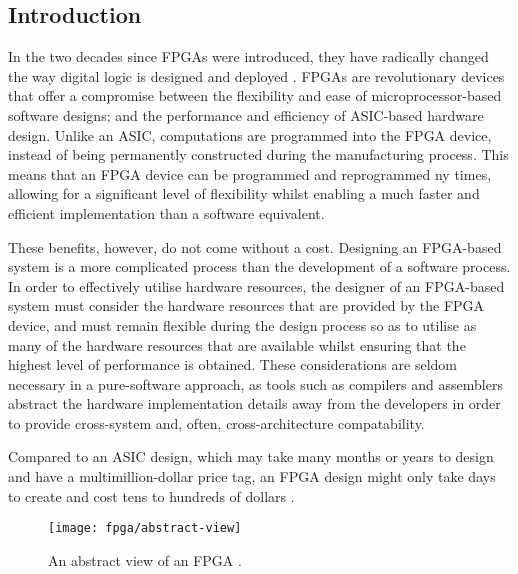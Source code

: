 \subsection{Introduction}
\label{fpga:introduction}
In the two decades since \glspl{FPGA} were introduced, they have radically
changed the way digital logic is designed and deployed \cite{Hauck:2007}.
\glspl{FPGA} are revolutionary devices that offer a compromise between the
flexibility and ease of microprocessor-based software designs; and the
performance and efficiency of \gls{ASIC}-based hardware design. Unlike an
\gls{ASIC}, computations are programmed into the \gls{FPGA} device, instead of
being permanently constructed during the manufacturing process. This means that
an \gls{FPGA} device can be programmed and reprogrammed ny times, allowing for
a significant level of flexibility whilst enabling a much faster and efficient
implementation than a software equivalent.

These benefits, however, do not come without a cost. Designing an
\gls{FPGA}-based system is a more complicated process than the development of a
software process. In order to effectively utilise hardware resources, the
designer of an \gls{FPGA}-based system must consider the hardware resources that
are provided by the \gls{FPGA} device, and must remain flexible during the
design process so as to utilise as many of the hardware resources that are
available whilst ensuring that the highest level of performance is obtained.
These considerations are seldom necessary in a pure-software approach, as tools
such as compilers and assemblers abstract the hardware implementation details
away from the developers in order to provide cross-system and, often,
cross-architecture compatability.

Compared to an \gls{ASIC} design, which may take many months or years to design
and have a multimillion-dollar price tag, an \gls{FPGA} design might only take
days to create and cost tens to hundreds of dollars \cite{Hauck:2007}.

\begin{figure}
    \centering
    \texttt{[image: fpga/abstract-view]}
    \caption[An abstract view of an \gls{FPGA}.]
        {An abstract view of an \gls{FPGA} \cite{Hauck:2007}.}
    \label{fig:fpga:abstract}
\end{figure}


